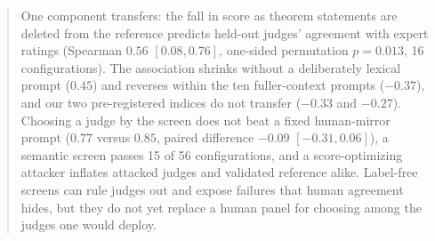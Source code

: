 \begin{abstract}
One component transfers: the fall in score as theorem statements are deleted from the reference predicts held-out judges' agreement with expert ratings (Spearman $0.56$ $[0.08, 0.76]$, one-sided permutation $p = 0.013$, 16 configurations).
The association shrinks without a deliberately lexical prompt ($0.45$) and reverses within the ten fuller-context prompts ($-0.37$), and our two pre-registered indices do not transfer ($-0.33$ and $-0.27$).
Choosing a judge by the screen does not beat a fixed human-mirror prompt ($0.77$ versus $0.85$, paired difference $-0.09$ $[-0.31, 0.06]$), a semantic screen passes 15 of 56 configurations, and a score-optimizing attacker inflates attacked judges and validated reference alike.
Label-free screens can rule judges out and expose failures that human agreement hides, but they do not yet replace a human panel for choosing among the judges one would deploy.
\end{abstract}
